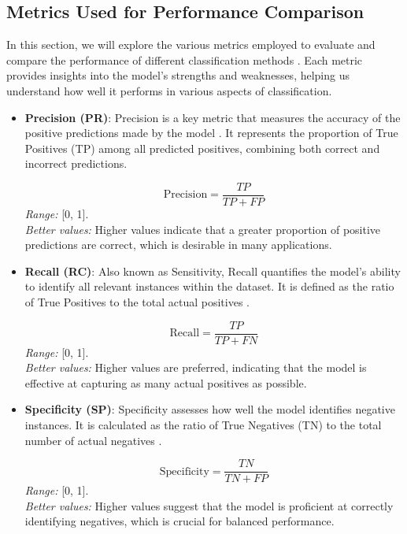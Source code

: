 \documentclass{article}
\begin{document}
\subsection{Metrics Used for Performance Comparison}

In this section, we will explore the various metrics employed to evaluate and compare the performance of different classification methods \cite{powers2011evaluation, sokolova2009systematic, flach2015evaluation}. Each metric provides insights into the model's strengths and weaknesses, helping us understand how well it performs in various aspects of classification.

\begin{itemize}
	\item \textbf{Precision (PR)}: Precision is a key metric that measures the accuracy of the positive predictions made by the model \cite{flach2015evaluation}. It represents the proportion of True Positives (TP) among all predicted positives, combining both correct and incorrect predictions.
	
	\[
	\text{Precision} = \frac{TP}{TP + FP}
	\]
	\textit{Range:} [0, 1]. \\
	\textit{Better values:} Higher values indicate that a greater proportion of positive predictions are correct, which is desirable in many applications.
	
	\item \textbf{Recall (RC)}: Also known as Sensitivity, Recall quantifies the model's ability to identify all relevant instances within the dataset. It is defined as the ratio of True Positives to the total actual positives \cite{powers2011evaluation}.
	
	\[
	\text{Recall} = \frac{TP}{TP + FN}
	\]
	\textit{Range:} [0, 1]. \\
	\textit{Better values:} Higher values are preferred, indicating that the model is effective at capturing as many actual positives as possible.
	
	\item \textbf{Specificity (SP)}: Specificity assesses how well the model identifies negative instances. It is calculated as the ratio of True Negatives (TN) to the total number of actual negatives \cite{sokolova2009systematic}.
	
	\[
	\text{Specificity} = \frac{TN}{TN + FP}
	\]
	\textit{Range:} [0, 1]. \\
	\textit{Better values:} Higher values suggest that the model is proficient at correctly identifying negatives, which is crucial for balanced performance.
	

\end{itemize}
\end{document}
